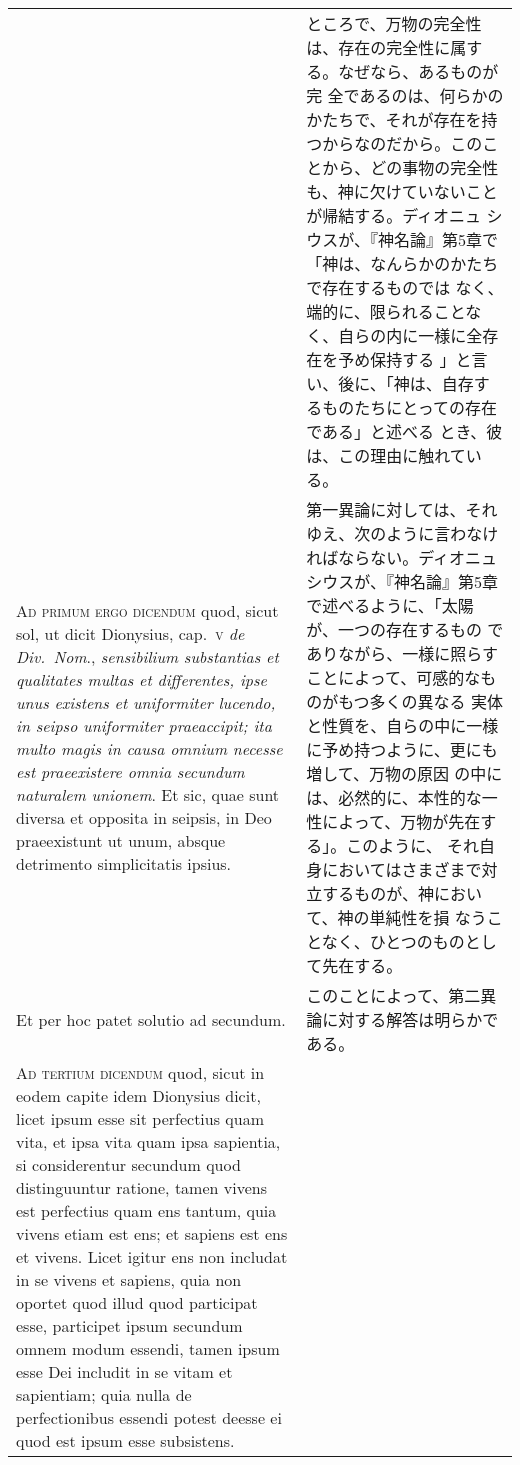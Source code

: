 \documentclass[10pt]{jsarticle}
\begin{document}
\begin{longtable}{p{21em}p{21em}}
&

ところで、万物の完全性は、存在の完全性に属する。なぜなら、あるものが完
全であるのは、何らかのかたちで、それが存在を持つからなのだから。このこ
とから、どの事物の完全性も、神に欠けていないことが帰結する。ディオニュ
シウスが、『神名論』第5章で「神は、なんらかのかたちで存在するものでは
なく、端的に、限られることなく、自らの内に一様に全存在を予め保持する
」と言い、後に、「神は、自存するものたちにとっての存在である」と述べる
とき、彼は、この理由に触れている。

\\


{\scshape Ad primum ergo dicendum} quod, sicut sol, ut dicit
Dionysius, cap.~{\scshape v} {\itshape de Div.~Nom}., {\itshape
sensibilium substantias et qualitates multas et differentes, ipse unus
existens et uniformiter lucendo, in seipso uniformiter praeaccipit;
ita multo magis in causa omnium necesse est praeexistere omnia
secundum naturalem unionem}. Et sic, quae sunt diversa et opposita in
seipsis, in Deo praeexistunt ut unum, absque detrimento simplicitatis
ipsius.

&

第一異論に対しては、それゆえ、次のように言わなければならない。ディオニュ
シウスが、『神名論』第5章で述べるように、「太陽が、一つの存在するもの
でありながら、一様に照らすことによって、可感的なものがもつ多くの異なる
実体と性質を、自らの中に一様に予め持つように、更にも増して、万物の原因
の中には、必然的に、本性的な一性によって、万物が先在する」。このように、
それ自身においてはさまざまで対立するものが、神において、神の単純性を損
なうことなく、ひとつのものとして先在する。

\\



Et per hoc patet solutio ad secundum.

&

このことによって、第二異論に対する解答は明らかである。

\\

{\scshape Ad tertium dicendum} quod, sicut in eodem capite idem
Dionysius dicit, licet ipsum esse sit perfectius quam vita, et ipsa
vita quam ipsa sapientia, si considerentur secundum quod distinguuntur
ratione, tamen vivens est perfectius quam ens tantum, quia vivens
etiam est ens; et sapiens est ens et vivens. Licet igitur ens non
includat in se vivens et sapiens, quia non oportet quod illud quod
participat esse, participet ipsum secundum omnem modum essendi, tamen
ipsum esse Dei includit in se vitam et sapientiam; quia nulla de
perfectionibus essendi potest deesse ei quod est ipsum esse
subsistens.


\end{longtable}
\end{document}
